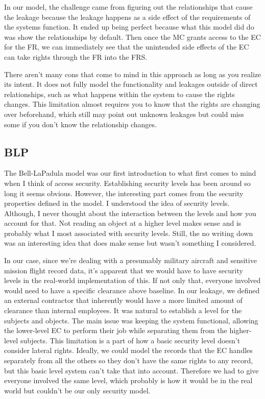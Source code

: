 \documentclass[10pt,journal,compsoc]{IEEEtran}
\begin{document}
In our model, the challenge came from figuring out the relationships that cause the leakage because the leakage happens as a side effect of the requirements of the systems function. It ended up being perfect because what this model did do was show the relationships by default. Then once the MC grants access to the EC for the FR, we can immediately see that the unintended side effects of the EC can take rights through the FR into the FRS. 

There aren't many cons that come to mind in this approach as long as you realize its intent. It does not fully model the functionality and leakages outside of direct relationships, such as what happens within the system to cause the rights changes. This limitation almost requires you to know that the rights are changing over beforehand, which still may point out unknown leakages but could miss some if you don't know the relationship changes. 

\subsection{BLP}

The Bell-LaPadula model was our first introduction to what first comes to mind when I think of access security. Establishing security levels has been around so long it seems obvious. However, the interesting part comes from the security properties defined in the model. I understood the idea of security levels. Although, I never thought about the interaction between the levels and how you account for that. Not reading an object at a higher level makes sense and is probably what I most associated with security levels. Still, the no writing down was an interesting idea that does make sense but wasn't something I considered. 

In our case, since we're dealing with a presumably military aircraft and sensitive mission flight record data, it's apparent that we would have to have security levels in the real-world implementation of this. If not only that, everyone involved would need to have a specific clearance above baseline. In our leakage, we defined an external contractor that inherently would have a more limited amount of clearance than internal employees. It was natural to establish a level for the subjects and objects. The main issue was keeping the system functional, allowing the lower-level EC to perform their job while separating them from the higher-level subjects. This limitation is a part of how a basic security level doesn't consider lateral rights. Ideally, we could model the records that the EC handles separately from all the others so they don't have the same rights to any record, but this basic level system can't take that into account. Therefore we had to give everyone involved the same level, which probably is how it would be in the real world but couldn't be our only security model.
\end{document}
